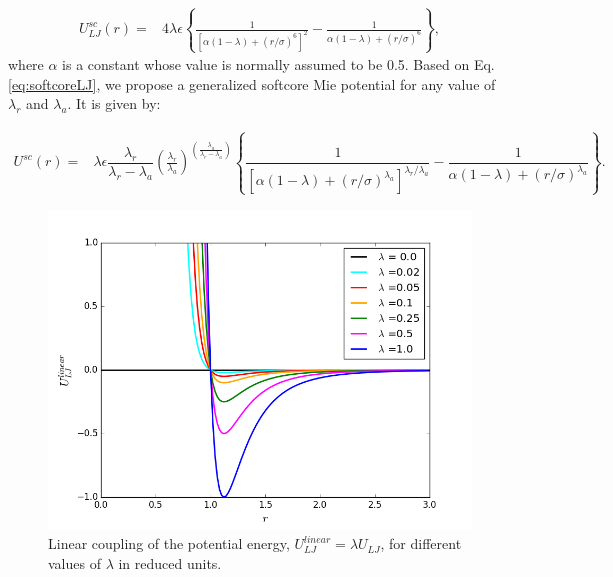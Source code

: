     \begin{equation}
    \label{eq:softcoreLJ}
    \begin{aligned}
    U_{LJ}^{sc}(r) {}=& 4\lambda\epsilon \left\lbrace\frac{1}{\left[\alpha(1-\lambda)+ (r/\sigma)^{6}\right]^{2}} - \frac{1}{\alpha(1-\lambda)+(r/\sigma)^{6}}\right\rbrace ,
    \end{aligned}
    \end{equation}
    where $\alpha$ is a constant whose value is  normally assumed to be 0.5.    Based on Eq. \ref{eq:softcoreLJ}, we propose a generalized softcore Mie potential for any value of $\lambda _{r}$ and $\lambda _{a}$. It is given by:
    
    \begin{equation}
    \label{eq:softcore}
    \begin{aligned}
    U^{sc}(r) {}=& \lambda\epsilon\dfrac{\lambda_r}{\lambda_r - \lambda_a} \left(\frac{\lambda_r}{\lambda_a} \right)^{\left( \frac{\lambda_a}{\lambda_r - \lambda_a} \right)} \left\lbrace\dfrac{1}{\left[\alpha(1-\lambda)+ (r/\sigma)^{\lambda_a}\right]^{\lambda_{r}/\lambda_{a}}} - \dfrac{1}{\alpha(1-\lambda)+(r/\sigma)^{\lambda_a}}\right\rbrace .
    \end{aligned}
    \end{equation}
    
    \begin{figure}[H]
    	\centering
    	\includegraphics[width=0.9\linewidth]{Figures/linear}
    	\caption{Linear coupling of the potential energy, $U^{linear}_{LJ} = \lambda U_{LJ}$, for different values of $\lambda$ in reduced units.}
    	\label{fig:linearpoten}
    \end{figure}    
    
